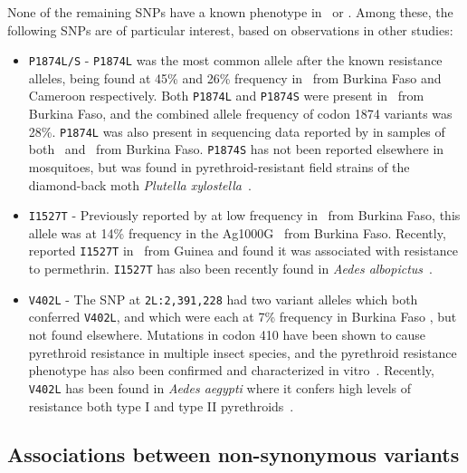 \documentclass[a4paper,11pt,abstracton,hidelinks]{scrartcl}
\begin{document}
None of the remaining SNPs have a known phenotype in \agam\ or \acol.
%
Among these, the following SNPs are of particular interest, based on observations in other studies:
%
\begin{itemize}
    \item \texttt{P1874L/S} - \texttt{P1874L} was the most common allele after the known resistance alleles, being found at 45\% and 26\% frequency in \agam\ from Burkina Faso and Cameroon respectively.
    Both \texttt{P1874L} and \texttt{P1874S} were present in \acol\ from Burkina Faso, and the combined allele frequency of codon 1874 variants was 28\%.
    \texttt{P1874L} was also present in sequencing data reported by \textcite{Jones2012} in samples of both \agam\ and \acol\ from Burkina Faso.
    \texttt{P1874S} has not been reported elsewhere in mosquitoes, but was found in pyrethroid-resistant field strains of the diamond-back moth \textit{Plutella xylostella}~\parencite{Sonoda2010}.
    \item \texttt{I1527T} - Previously reported by \textcite{Jones2012} at low frequency in \acol\ from Burkina Faso, this allele was at 14\% frequency in the Ag1000G \acol\ from Burkina Faso.
    Recently, \textcite{Collins2019} reported \texttt{I1527T} in \agam\ from Guinea and found it was associated with resistance to permethrin.
    \texttt{I1527T} has also been recently found in \textit{Aedes albopictus}~\parencite{Auteri2018}.
    \item \texttt{V402L} - The SNP at \texttt{2L:2,391,228} had two variant alleles which both conferred \texttt{V402L}, and which were each at 7\% frequency in Burkina Faso \acol, but not found elsewhere.
    Mutations in codon 410 have been shown to cause pyrethroid resistance in multiple insect species, and the pyrethroid resistance phenotype has also been confirmed and characterized in vitro~\parencite{Dong2014}.
    Recently, \texttt{V402L} has been found in \textit{Aedes aegypti} where it confers high levels of resistance both type I and type II pyrethroids~\parencite{Haddi2017,VillanuevaSegura2020}.
\end{itemize}
%


\subsection{Associations between non-synonymous variants}\label{subsec:results-ld}
\end{document}
